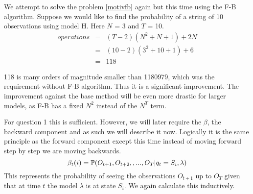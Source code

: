 \begin{example}
    \label{motivfb2}
    We attempt to solve the problem \ref{motivfb} again but this time using the F-B algorithm. Suppose we would like to find the probability of a string of 10 observations using model H. Here $N$ = 3 and $T$ = 10. 
    \begin{eqnarray}
        operations & = & (T-2)(N^2 + N + 1) + 2N \\
                   & = & (10-2)(3^2 + 10 + 1) + 6\\
                   & = & 118
    \end{eqnarray}

    118 is many orders of magnitude smaller than 1180979, which was the requirement without F-B algorithm. Thus it is a significant improvement. The improvement against the base method will be even more drastic for larger models, as F-B has a fixed $N^2$ instead of the $N^T$ term.  
\end{example}


For question 1 this is sufficient. However, we will later require the $\beta$, the backward component and as such we will describe it now. Logically it is the same principle as the forward component except this time instead of moving forward step by step we are moving backwards.
\begin{equation}
    \label{beta}
    \beta_t(i) = \mathbb{P} (O_{t+1},O_{t+2},,...,O_T | q_t=S_i, \lambda)
\end{equation}
This represents the probability of seeing the observations $O_{t+1}$ up to $O_T$ given that at time $t$ the model $\lambda$ is at state $S_i$. We again calculate this inductively.

